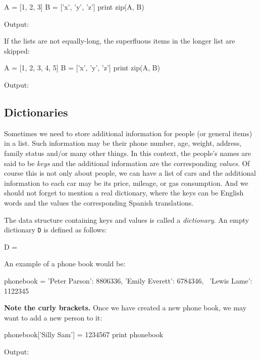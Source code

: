 \begin{bluecode}
A = [1, 2, 3]
B = ['x', 'y', 'z']
print zip(A, B)
\end{bluecode}
Output:

\begin{greencode}
[(1, 'x'), (2, 'y'), (3, 'z')]
\end{greencode}
If the lists are not equally-long, the superfluous items in the longer list 
are skipped:

\begin{bluecode}
A = [1, 2, 3, 4, 5]
B = ['x', 'y', 'z']
print zip(A, B)
\end{bluecode}
Output:

\begin{greencode}
[(1, 'x'), (2, 'y'), (3, 'z')]
\end{greencode}

\subsection{Dictionaries}

Sometimes we need to store additional information for 
people (or general items) in a list. Such information may be  
their phone number, age, weight, address, family 
status and/or many other things. In this context, the 
people's names are said to be {\em keys} and the additional 
information are the corresponding {\em values}. Of course this 
is not only about people, we can have a list of cars and the 
additional information to each car may be its price, mileage, or
gas consumption. And we should not forget to mention a real 
dictionary, where the keys can be English words and the values the 
corresponding Spanish translations.

The data structure containing keys and values is called a {\em dictionary}. 
An empty dictionary {\tt D} is defined as follows:

\begin{bluecode}
D = {}
\end{bluecode}
An example of a phone book would be:

\begin{bluecode}
phonebook = {'Peter Parson': 8806336, 'Emily Everett': 6784346, \
'Lewis Lame': 1122345}
\end{bluecode}
{\bf Note the curly brackets.} 
Once we have created a new phone book, we may want to add a new person to it:

\begin{bluecode}
phonebook['Silly Sam'] = 1234567
print phonebook
\end{bluecode}
Output:

